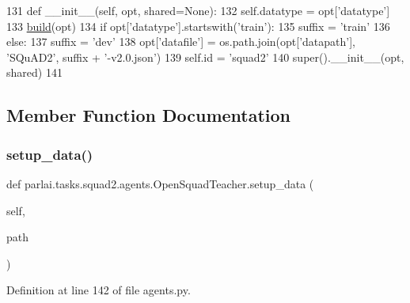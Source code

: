 \begin{DoxyCode}
131     \textcolor{keyword}{def }\_\_init\_\_(self, opt, shared=None):
132         self.datatype = opt[\textcolor{stringliteral}{'datatype'}]
133         \hyperlink{namespaceparlai_1_1mturk_1_1tasks_1_1talkthewalk_1_1download_a8c0fbb9b6dfe127cb8c1bd6e7c4e33fd}{build}(opt)
134         \textcolor{keywordflow}{if} opt[\textcolor{stringliteral}{'datatype'}].startswith(\textcolor{stringliteral}{'train'}):
135             suffix = \textcolor{stringliteral}{'train'}
136         \textcolor{keywordflow}{else}:
137             suffix = \textcolor{stringliteral}{'dev'}
138         opt[\textcolor{stringliteral}{'datafile'}] = os.path.join(opt[\textcolor{stringliteral}{'datapath'}], \textcolor{stringliteral}{'SQuAD2'}, suffix + \textcolor{stringliteral}{'-v2.0.json'})
139         self.id = \textcolor{stringliteral}{'squad2'}
140         super().\_\_init\_\_(opt, shared)
141 
\end{DoxyCode}


\subsection{Member Function Documentation}
\mbox{\label{classparlai_1_1tasks_1_1squad2_1_1agents_1_1OpenSquadTeacher_a7095abdf14125fc5cdae594fb63b71a0}} 
\subsubsection{\texorpdfstring{setup\+\_\+data()}{setup\_data()}}
{\footnotesize\ttfamily def parlai.\+tasks.\+squad2.\+agents.\+Open\+Squad\+Teacher.\+setup\+\_\+data (\begin{DoxyParamCaption}\item[{}]{self,  }\item[{}]{path }\end{DoxyParamCaption})}



Definition at line 142 of file agents.\+py.


